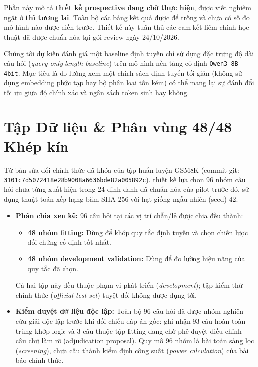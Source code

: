 \documentclass[11pt,a4paper]{report}
\begin{document}
\begin{tcolorbox}[title=Quy tắc Trình bày Phương pháp Luận]
Phần này mô tả \textbf{thiết kế prospective đang chờ thực hiện}, được viết nghiêm ngặt ở \textbf{thì tương lai}. Toàn bộ các bảng kết quả được để trống và chưa có số đo mô hình nào được điền trước. Thiết kế này tuân thủ các cam kết liêm chính học thuật đã được chuẩn hóa tại gói review ngày 24/10/2026.
\end{tcolorbox}

Chúng tôi dự kiến đánh giá một baseline định tuyến chỉ sử dụng đặc trưng độ dài câu hỏi (\textit{query-only length baseline}) trên mô hình nền tảng cố định \texttt{Qwen3-8B-4bit}. Mục tiêu là đo lường xem một chính sách định tuyến tối giản (không sử dụng embedding phức tạp hay bộ phân loại tốn kém) có thể mang lại sự đánh đổi tối ưu giữa độ chính xác và ngân sách token sinh hay không.

\section{Tập Dữ liệu \& Phân vùng 48/48 Khép kín}

Từ bản sửa đổi chính thức đã khóa của tập huấn luyện GSM8K (commit git: \texttt{3101c7d5072418e28b9008a6636bde82a006892c}), thiết kế lựa chọn 96 nhóm câu hỏi chưa từng xuất hiện trong 24 định danh đã chuẩn hóa của pilot trước đó, sử dụng thuật toán xếp hạng băm SHA-256 với hạt giống ngẫu nhiên (seed) 42.

\begin{itemize}[leftmargin=*]
    \item \textbf{Phân chia xen kẽ:} 96 câu hỏi tại các vị trí chẵn/lẻ được chia đều thành:
    \begin{itemize}
        \item \textbf{48 nhóm fitting:} Dùng để khớp quy tắc định tuyến và chọn chiến lược đối chứng cố định tốt nhất.
        \item \textbf{48 nhóm development validation:} Dùng để đo lường hiệu năng của quy tắc đã chọn.
    \end{itemize}
    Cả hai tập này đều thuộc phạm vi phát triển (\textit{development}); tập kiểm thử chính thức (\textit{official test set}) tuyệt đối không được đụng tới.
    \item \textbf{Kiểm duyệt dữ liệu độc lập:} Toàn bộ 96 câu hỏi đã được nhóm nghiên cứu giải độc lập trước khi đối chiếu đáp án gốc: ghi nhận 93 câu hoàn toàn trùng khớp logic và 3 câu thuộc tập fitting đang chờ phê duyệt điều chỉnh câu chữ làm rõ (adjudication proposal). Quy mô 96 nhóm là bài toán sàng lọc (\textit{screening}), chưa cấu thành kiểm định công suất (\textit{power calculation}) của bài báo chính thức.
\end{itemize}
\end{document}

